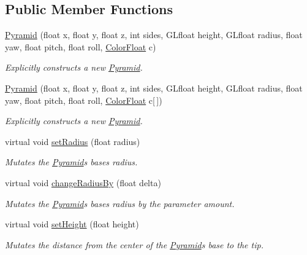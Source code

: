\subsection*{Public Member Functions}
\begin{DoxyCompactItemize}
\item 
\hyperlink{classtsgl_1_1_pyramid_ad980b2565031617f41a89d62a85f4c85}{Pyramid} (float x, float y, float z, int sides, G\+Lfloat height, G\+Lfloat radius, float yaw, float pitch, float roll, \hyperlink{structtsgl_1_1_color_float}{Color\+Float} c)
\begin{DoxyCompactList}\small\item\em Explicitly constructs a new \hyperlink{classtsgl_1_1_pyramid}{Pyramid}. \end{DoxyCompactList}\item 
\hyperlink{classtsgl_1_1_pyramid_aeefc2de2b046398e194fc8b041eedc95}{Pyramid} (float x, float y, float z, int sides, G\+Lfloat height, G\+Lfloat radius, float yaw, float pitch, float roll, \hyperlink{structtsgl_1_1_color_float}{Color\+Float} c\mbox{[}$\,$\mbox{]})
\begin{DoxyCompactList}\small\item\em Explicitly constructs a new \hyperlink{classtsgl_1_1_pyramid}{Pyramid}. \end{DoxyCompactList}\item 
virtual void \hyperlink{classtsgl_1_1_pyramid_ac949cacc0db5fb112d92e2ec987cd5c3}{set\+Radius} (float radius)
\begin{DoxyCompactList}\small\item\em Mutates the \hyperlink{classtsgl_1_1_pyramid}{Pyramid}\textquotesingle{}s base\textquotesingle{}s radius. \end{DoxyCompactList}\item 
virtual void \hyperlink{classtsgl_1_1_pyramid_a91f86ca2ac58df9ac8d2ad00781b8442}{change\+Radius\+By} (float delta)
\begin{DoxyCompactList}\small\item\em Mutates the \hyperlink{classtsgl_1_1_pyramid}{Pyramid}\textquotesingle{}s base\textquotesingle{}s radius by the parameter amount. \end{DoxyCompactList}\item 
virtual void \hyperlink{classtsgl_1_1_pyramid_acb4db4a56452bb0e45dcd120ef517747}{set\+Height} (float height)
\begin{DoxyCompactList}\small\item\em Mutates the distance from the center of the \hyperlink{classtsgl_1_1_pyramid}{Pyramid}\textquotesingle{}s base to the tip. \end{DoxyCompactList}\item 

\end{DoxyCompactItemize}

